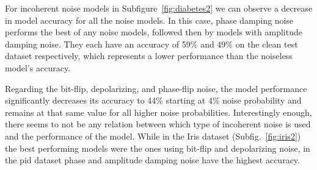 For incoherent noise models in Subfigure~\ref{fig:diabetes2}
we can observe a decrease in model accuracy for all the noise
models. In this case, phase damping noise performs the best
of any noise models, followed then by models with amplitude
damping noise. They each have an accuracy of 59\% and 49\% on the clean
test dataset respectively, which represents a lower performance
than the noiseless model's accuracy. \

Regarding the bit-flip, depolarizing, and phase-flip noise, the model
performance significantly decreases its accuracy to 44\% starting at
4\% noise probability and remains at that same value for all
higher noise probabilities. Interestingly enough, there seems
to not be any relation between which type of incoherent noise
is used and the performance of the model. While in the Iris
dataset (Subfig.~\ref{fig:iris2}) the best performing models
were the ones using bit-flip and depolarizing noise, in the
\ac{pid} dataset phase and amplitude damping noise have the
highest accuracy. \

